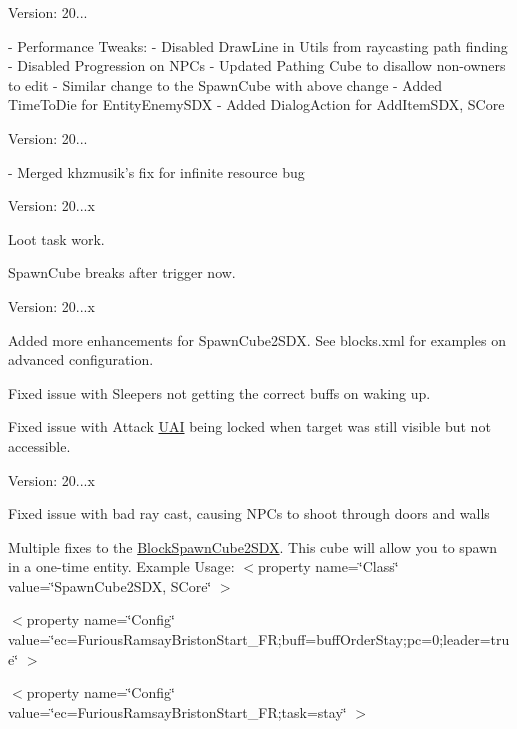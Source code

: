 Version\+: 20... \begin{DoxyVerb}- Performance Tweaks:
    - Disabled DrawLine in Utils from raycasting path finding
    - Disabled Progression on NPCs
- Updated Pathing Cube to disallow non-owners to edit
- Similar change to the SpawnCube with above change
- Added TimeToDie for EntityEnemySDX
- Added DialogAction for AddItemSDX, SCore
\end{DoxyVerb}
 Version\+: 20... \begin{DoxyVerb}- Merged khzmusik's fix for infinite resource bug
\end{DoxyVerb}
 Version\+: 20...\+x
\begin{DoxyItemize}
\item Loot task work.
\item Spawn\+Cube breaks after trigger now.
\end{DoxyItemize}

Version\+: 20...\+x
\begin{DoxyItemize}
\item Added more enhancements for Spawn\+Cube2\+SDX. See blocks.\+xml for examples on advanced configuration.
\item Fixed issue with Sleepers not getting the correct buffs on waking up.
\item Fixed issue with Attack \mbox{\hyperlink{namespace_u_a_i}{UAI}} being locked when target was still visible but not accessible.
\end{DoxyItemize}

Version\+: 20...\+x
\begin{DoxyItemize}
\item Fixed issue with bad ray cast, causing NPCs to shoot through doors and walls
\item Multiple fixes to the \mbox{\hyperlink{class_block_spawn_cube2_s_d_x}{Block\+Spawn\+Cube2\+SDX}}. This cube will allow you to spawn in a one-\/time entity. Example Usage\+: $<$property name=\char`\"{}\+Class\char`\"{} value=\char`\"{}\+Spawn\+Cube2\+SDX, SCore\char`\"{} $>$

$<$property name=\char`\"{}\+Config\char`\"{} value=\char`\"{}ec=\+Furious\+Ramsay\+Briston\+Start\+\_\+\+FR;buff=buff\+Order\+Stay;pc=0;leader=true\char`\"{} $>$

$<$property name=\char`\"{}\+Config\char`\"{} value=\char`\"{}ec=\+Furious\+Ramsay\+Briston\+Start\+\_\+\+FR;task=stay\char`\"{} $>$
\end{DoxyItemize}

